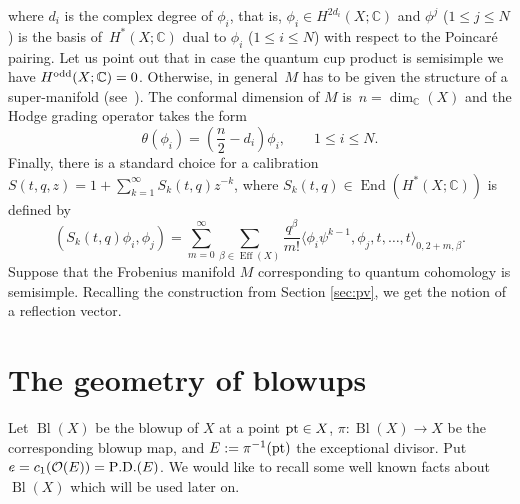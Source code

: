 \documentclass[pdftex]{sigma}
\numberwithin{equation}{section}
\newcommand{\CC}{\mathbb{C}}
\renewcommand{\O}{\mathcal{O}}
\begin{document}
where $d_i$ is the complex degree of $\phi_i$, that is, $\phi_i\in
H^{2d_i}(X;\CC)$ and $\phi^j$ ($1\leq j\leq N$) is the basis of~$H^*(X;\CC)$ dual to $\phi_i$ ($1\leq i\leq N$) with respect to the
Poincar\'e pairing. Let us point out that in case the quantum cup
product is semisimple we have $H^{\rm odd}(X;\CC)=0$. Otherwise, in
general~$M$ has to be given the structure of a super-manifold (see~\cite{Ma}). The conformal dimension of $M$ is~$n=\operatorname{dim}_\CC(X)$ and the Hodge grading operator takes the
form
\begin{equation}\label{qcoh_hgo}
\theta(\phi_i) =\left(\frac{n}{2} - d_i\right) \phi_i,\qquad 1\leq i\leq N.
\end{equation}
Finally, there is a standard choice for a calibration
$S(t,q,z)=1+\sum_{k=1}^\infty S_k(t,q) z^{-k}$, where
$S_k(t,q)\in \operatorname{End}(H^*(X;\CC))$ is defined by
\begin{equation}\label{calibration}
(S_k(t,q)\phi_i,\phi_j) =
\sum_{m=0}^\infty
\sum_{\beta\in \operatorname{Eff}(X)} \frac{q^\beta}{m!}
\big\langle \phi_i \psi^{k-1}, \phi_j, t,\dots,t\big\rangle_{0,2+m,\beta}.
\end{equation}
Suppose that the Frobenius manifold $M$ corresponding to quantum cohomology is
semisimple. Recalling the construction from Section \ref{sec:pv}, we get the notion
of a reflection vector.

\section{The geometry of blowups}\label{sec:blowups}

Let $\operatorname{Bl}(X)$ be the blowup of $X$ at a point ${\rm pt}\in X$,
$\pi\colon \operatorname{Bl}(X)\to X$ be the corresponding
blowup map, and $E:=\pi^{-1}({\rm pt})$ the
exceptional divisor. Put $e=c_1(\O(E))={\rm P.D.}(E)$.
We would like to recall some well known facts about
$\operatorname{Bl}(X)$ which will be used later on.
\end{document}
